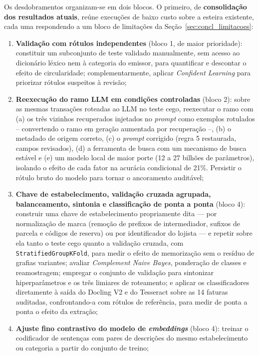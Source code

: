 Os desdobramentos organizam-se em dois blocos. O primeiro, de \textbf{consolidação dos resultados atuais}, reúne execuções de baixo custo sobre a esteira existente, cada uma respondendo a um bloco de limitações da Seção~\ref{sec:concl_limitacoes}:
\begin{enumerate}
	\item \textbf{Validação com rótulos independentes} (bloco 1, de maior prioridade): constituir um subconjunto de teste validado manualmente, sem acesso ao dicionário léxico nem à categoria do emissor, para quantificar e descontar o efeito de circularidade; complementarmente, aplicar \textit{Confident Learning} para priorizar rótulos suspeitos à revisão;
	\item \textbf{Reexecução do ramo LLM em condições controladas} (bloco 2): sobre as mesmas transações roteadas ao LLM no teste cego, reexecutar o ramo com (a) os três vizinhos recuperados injetados no \textit{prompt} como exemplos rotulados -- convertendo o ramo em geração aumentada por recuperação --, (b) o metadado de origem correto, (c) o \textit{prompt} corrigido (regra 5 restaurada, campos revisados), (d) a ferramenta de busca com um mecanismo de busca estável e (e) um modelo local de maior porte (12 a 27 bilhões de parâmetros), isolando o efeito de cada fator na acurácia condicional de 21\%. Persistir o rótulo bruto do modelo para tornar o ancoramento auditável;
	\item \textbf{Chave de estabelecimento, validação cruzada agrupada, balanceamento, sintonia e classificação de ponta a ponta} (bloco 4): construir uma chave de estabelecimento propriamente dita --- por normalização de marca (remoção de prefixos de intermediador, sufixos de parcela e códigos de reserva) ou por identificador do lojista --- e repetir sobre ela tanto o teste cego quanto a validação cruzada, com \texttt{StratifiedGroupKFold}, para medir o efeito de memorização sem o resíduo de grafias variantes; avaliar \textit{Complement Naive Bayes}, ponderação de classes e reamostragem; empregar o conjunto de validação para sintonizar hiperparâmetros e os três limiares de roteamento; e aplicar os classificadores diretamente à saída do Docling V2 e do Tesseract sobre as 14 faturas auditadas, confrontando-a com rótulos de referência, para medir de ponta a ponta o efeito da extração;
	\item \textbf{Ajuste fino contrastivo do modelo de \textit{embeddings}} (bloco 4): treinar o codificador de sentenças com pares de descrições do mesmo estabelecimento ou categoria a partir do conjunto de treino;

\end{enumerate}
